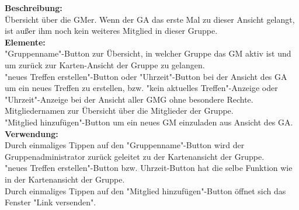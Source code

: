 \textbf{Beschreibung:}\\
Übersicht über die GMer. Wenn der GA das erste Mal zu dieser Ansicht gelangt, ist außer ihm noch kein weiteres Mitglied in dieser Gruppe.\\
\textbf{Elemente:}\\
"Gruppenname"-Button zur Übersicht, in welcher Gruppe das GM aktiv ist und um zurück zur Karten-Ansicht der Gruppe zu gelangen.\\
"neues Treffen erstellen"-Button oder "Uhrzeit"-Button bei der Ansicht des GA um ein neues Treffen zu erstellen, bzw. "kein aktuelles Treffen"-Anzeige oder "Uhrzeit"-Anzeige bei der Ansicht aller GMG ohne besondere Rechte.\\
Mitgliedernamen zur Übersicht über die Mitglieder der Gruppe.\\
"Mitglied hinzufügen"-Button um ein neues GM einzuladen aus Ansicht des GA.\\
\textbf{Verwendung:}\\
Durch einmaliges Tippen auf den "Gruppenname"-Button wird der Gruppenadministrator zurück geleitet zu der Kartenansicht der Gruppe.\\
"neues Treffen erstellen"-Button bzw. Uhrzeit-Button hat die selbe Funktion wie in der Kartenansicht der Gruppe.\\
Durch einmaliges Tippen auf den "Mitglied hinzufügen"-Button öffnet sich das Fenster "Link versenden".
\clearpage
\newpage


